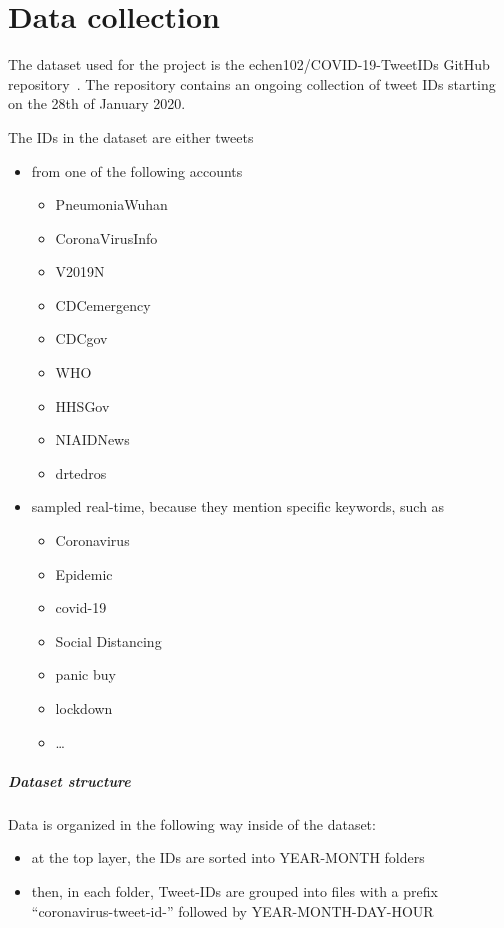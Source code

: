 \chapter{Data collection}
\label{cha:data}
The dataset used for the project is the echen102/COVID-19-TweetIDs GitHub repository~\cite{chen2020tracking}. The repository contains an ongoing collection of tweet IDs starting on the 28th of January 2020.

The IDs in the dataset are either tweets
\begin{itemize}
	\item from one of the following accounts
	\begin{itemize}
		\item PneumoniaWuhan
		\item CoronaVirusInfo
		\item V2019N
		\item CDCemergency
		\item CDCgov
		\item WHO
		\item HHSGov
		\item NIAIDNews
		\item drtedros
	\end{itemize}
	\item sampled real-time, because they mention specific keywords, such as
	\begin{itemize}
		\item Coronavirus
		\item Epidemic
		\item covid-19
		\item Social Distancing
		\item panic buy
		\item lockdown
		\item \ldots
	\end{itemize}
\end{itemize}

\paragraph{Dataset structure}

Data is organized in the following way inside of the dataset:

\begin{itemize}
	\item at the top layer, the IDs are sorted into YEAR-MONTH folders
	\item then, in each folder, Tweet-IDs are grouped into files with a prefix “coronavirus-tweet-id-” followed by YEAR-MONTH-DAY-HOUR
\end{itemize}


